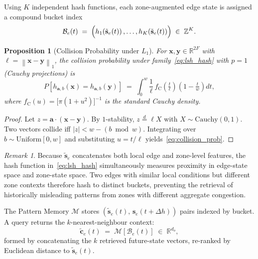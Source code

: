 \documentclass[journal,letterpaper,10pt]{IEEEtran}
\newtheorem{proposition}[theorem]{Proposition}
\theoremstyle{definition}
\theoremstyle{remark}
\newtheorem{remark}{Remark}
\newcommand{\norm}[2]{\left\|#1\right\|_{#2}}
\newcommand{\R}{\mathbb{R}}
\begin{document}
Using $K$ independent hash functions, each zone-augmented edge state
is assigned a compound bucket index
\begin{equation}
  \mathcal{B}_{e}(t)
  \;=\;
  \Bigl(
    h_1\!\left(\tilde{\mathbf{s}}_{e}(t)\right),
    \ldots,
    h_K\!\left(\tilde{\mathbf{s}}_{e}(t)\right)
  \Bigr)
  \;\in\;\mathbb{Z}^K.
  \label{eq:bucket}
\end{equation}

\begin{proposition}[Collision Probability under $L_1$]
\label{prop:collision}
For $\mathbf{x},\mathbf{y}\in\R^{2F}$ with
$\ell=\norm{\mathbf{x}-\mathbf{y}}{1}$, the collision probability
under family~\eqref{eq:lsh_hash} with $p=1$ (Cauchy projections) is
\begin{equation}
  P\!\left[h_{\mathbf{a},b}(\mathbf{x})=h_{\mathbf{a},b}(\mathbf{y})\right]
  \;=\;
  \int_{0}^{w}
    \frac{1}{\ell}\,
    f_{\mathrm{C}}\!\!\left(\tfrac{t}{\ell}\right)
    \!\left(1-\tfrac{t}{w}\right)
  dt,
  \label{eq:collision_prob}
\end{equation}
where $f_{\mathrm{C}}(u)=\bigl[\pi(1+u^{2})\bigr]^{-1}$ is the
standard Cauchy density.
\end{proposition}

\begin{proof}
Let $z=\mathbf{a}\cdot(\mathbf{x}-\mathbf{y})$.  By $1$-stability,
$z\overset{d}{=}\ell X$ with $X\sim\mathrm{Cauchy}(0,1)$.  Two
vectors collide iff $|z|<w-(b\bmod w)$.  Integrating over
$b\sim\mathrm{Uniform}[0,w]$ and substituting $u=t/\ell$
yields~\eqref{eq:collision_prob}.
\end{proof}

\begin{remark}
Because $\tilde{\mathbf{s}}_{e}$ concatenates both local edge and
zone-level features, the hash function in~\eqref{eq:lsh_hash}
simultaneously measures proximity in edge-state space and zone-state
space.  Two edges with similar local conditions but different zone
contexts therefore hash to distinct buckets, preventing the retrieval
of historically misleading patterns from zones with different
aggregate congestion.
\end{remark}

The Pattern Memory $\mathcal{M}$ stores
$(\tilde{\mathbf{s}}_{e}(t),\, \mathbf{s}_{e}(t+\Delta h))$ pairs
indexed by bucket.  A query returns the $k$-nearest-neighbour
context:
\begin{equation}
  \tilde{\mathbf{c}}_{e}(t)
  \;=\;
  \mathcal{M}\!\left[\mathcal{B}_e(t)\right]
  \;\in\;\R^{d_o},
  \label{eq:context}
\end{equation}
formed by concatenating the $k$ retrieved future-state vectors,
re-ranked by Euclidean distance to $\tilde{\mathbf{s}}_{e}(t)$.
\end{document}
